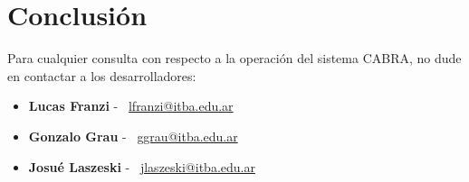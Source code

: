 \section{Conclusión} \label{conclusion}

Para cualquier consulta con respecto a la operación del sistema CABRA, no dude en contactar a los desarrolladores:

\begin{itemize}
    \item \textbf{Lucas Franzi} - \
    \href{mailto:lfranzi@itba.edu.ar}{lfranzi@itba.edu.ar}
    \item \textbf{Gonzalo Grau} - \
    \href{mailto:ggrau@itba.edu.ar}{ggrau@itba.edu.ar}
    \item \textbf{Josué Laszeski} - \
    \href{mailto:jlaszeski@itba.edu.ar}{jlaszeski@itba.edu.ar}
\end{itemize}
